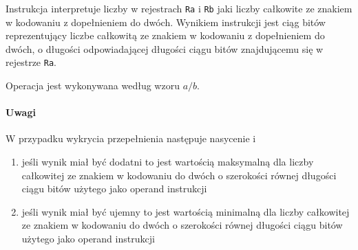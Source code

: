 Instrukcja interpretuje liczby w rejestrach \texttt{Ra} i \texttt{Rb} jaki
liczby całkowite ze znakiem w kodowaniu z dopełnieniem do dwóch. Wynikiem
instrukcji jest ciąg bitów reprezentujący liczbe całkowitą ze znakiem w
kodowaniu z dopełnieniem do dwóch, o długości odpowiadającej długości ciągu
bitów znajdującemu się w rejestrze \texttt{Ra}.

Operacja jest wykonywana według wzoru $a / b$.

\paragraph*{Uwagi}

W przypadku wykrycia przepełnienia następuje nasycenie i
\begin{enumerate}
\item jeśli wynik miał być dodatni to jest wartością maksymalną dla liczby
    całkowitej ze znakiem w kodowaniu do dwóch o szerokości równej długości
    ciągu bitów użytego jako operand instrukcji
\item jeśli wynik miał być ujemny to jest wartością minimalną dla liczby
    całkowitej ze znakiem w kodowaniu do dwóch o szerokości równej długości
    ciągu bitów użytego jako operand instrukcji
\end{enumerate}
